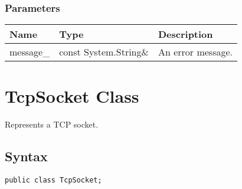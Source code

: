 \documentclass[a4paper,oneside,11.000000pt]{book}
\begin{document}
\subsubsection*{Parameters}
\begin{flushleft}
\begin{supertabular}[l]{lll}
\textbf{Name}
& \textbf{Type}
& \textbf{Description}
\\
\hline
message\_
& const System.\-String\&\-
& An error message.

\\
\end{supertabular}

\end{flushleft}
\clearpage
\hypertarget{System.Net.Sockets.TcpSocket}{\section{TcpSocket Class}}
\begin{flushleft}
Represents a TCP socket.

\end{flushleft}
\subsection*{Syntax}\texttt{public class TcpSocket;}
\end{document}
